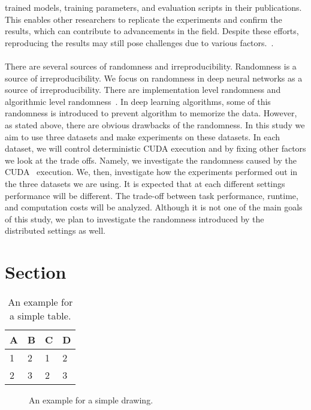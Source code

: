 trained models, training parameters, and evaluation scripts in their publications. 
This enables other researchers to replicate the experiments and confirm the results, 
which can contribute to advancements in the field. Despite these efforts, reproducing 
the results may still pose challenges due to various factors.~\cite{chenetal}.
\\
\\
There are several sources of randomness and irreproducibility. Randomness is a source of irreproducibility.
We focus on randomness in deep neural networks as a source of irreproducibility. There are implementation level
randomness and algorithmic level randomness~\cite{zhuang2022randomness}. In deep learning algorithms, some of this randomness is introduced to
prevent algorithm to memorize the data. However, as stated above, there are obvious drawbacks of the randomness. In this study we aim to use three datasets and make experiments on these
datasets. In each dataset, we will control deterministic CUDA execution and by fixing other factors we look at the
trade offs. Namely, we investigate the randomness caused by the CUDA~\cite{ghorpade2012gpgpu} execution. We, then, investigate how the experiments performed out
in the three datasets we are using. It is expected that at each different settings 
performance will be different. The trade-off between task performance, runtime, and computation costs will be analyzed.
Although it is not one of the main goals of this study, we plan to investigate the randomness introduced by the distributed settings as well.

\section{Section}

\begin{table}[htpb]
  \caption[Example table]{An example for a simple table.}\label{tab:sample}
  \centering
  \begin{tabular}{l l l l}
    \toprule
      A & B & C & D \\
    \midrule
      1 & 2 & 1 & 2 \\
      2 & 3 & 2 & 3 \\
    \bottomrule
  \end{tabular}
\end{table}



\begin{figure}[htpb]
  \centering
  \caption[Example drawing]{An example for a simple drawing.}\label{fig:sample-drawing}
\end{figure}

